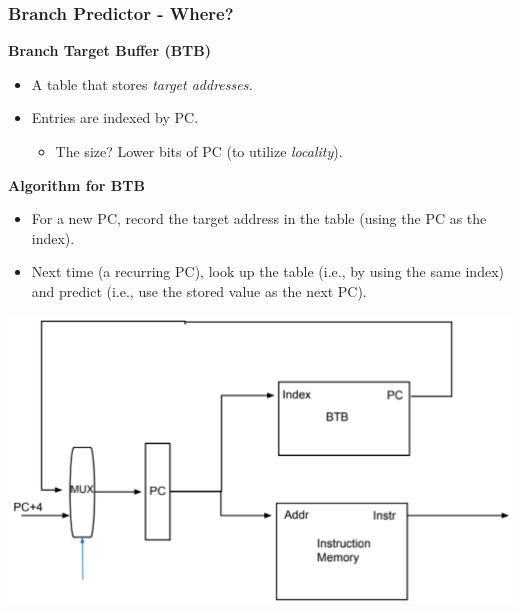 \documentclass[10pt]{article}
\begin{document}
\subsubsection*{Branch Predictor - Where?}
\textbf{Branch Target Buffer (BTB)}
\begin{itemize}
    \item A table that stores \textit{target addresses.}
    \item Entries are indexed by PC.
    \begin{itemize}
        \item The size?  Lower bits of PC (to utilize \textit{locality}).
    \end{itemize}
\end{itemize}
\textbf{Algorithm for BTB}
\begin{itemize}
    \item For a new PC, record the target address in the table (using the PC as the index).
    \item Next time (a recurring PC), look up the table (i.e., by using the same index) and predict (i.e., use the stored value as the next PC).
\end{itemize}
\begin{center}
    \includegraphics*[scale=0.7]{W4_2.png}
\end{center}
\end{document}

